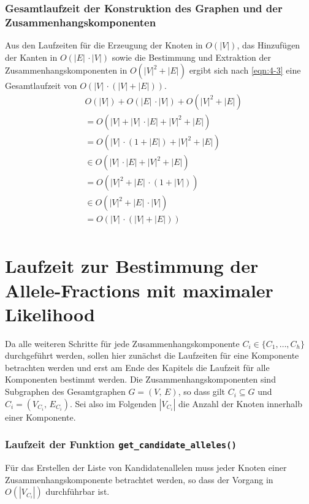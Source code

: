 \subsubsection{Gesamtlaufzeit der Konstruktion des Graphen und der Zusammenhangskomponenten} \label{subsec:graph_compl}
Aus den Laufzeiten für die Erzeugung der Knoten in $ O(|V|) $, das Hinzufügen der Kanten in $ O(|E|\, \cdotp |V|) $  sowie die Bestimmung und Extraktion der Zusammenhangskomponenten in $ O(|V|^2 + |E|) $ ergibt sich nach \eqref{eqn:4-3} eine Gesamtlaufzeit von $ O(|V| \, \cdotp (|V| + |E|)) $. \\
\begin{equation} \label{eqn:4-3}
\tag{4-3}
\begin{aligned}
&\ {} O(|V|) + O(|E|\, \cdotp |V|) + O(|V|^2 + |E|) \\
&\ = O(|V| + |V|\, \cdotp |E| + |V|^2 + |E|)\\
&\ = O(|V|\, \cdotp (1 + |E|) + |V|^2 + |E|)\\
&\ \in O(|V|\, \cdotp |E| + |V|^2 + |E|)\\
&\ = O(|V|^2 + |E| \, \cdotp (1 + |V|))\\
&\ \in O(|V|^2 + |E| \, \cdotp |V|)\\
&\ = O(|V| \, \cdotp (|V| + |E|))\\
\end{aligned}
\end{equation}

\section[Laufzeitberechnung der VAFs mit maximaler Likelihood]{Laufzeit zur Bestimmung der Allele-Fractions mit maximaler Likelihood}

Da alle weiteren Schritte für jede Zusammenhangskomponente $C_{i} \in \{C_{1}, \dots , C_{h}\}$ durchgeführt werden, sollen hier zunächst die Laufzeiten für eine Komponente betrachten werden und erst am Ende des Kapitels die Laufzeit für alle Komponenten bestimmt werden. Die Zusammenhangskomponenten sind Subgraphen des Gesamtgraphen $G=(V, \, E)$, so dass gilt $ C_{i} \subseteq G$ und $C_{i}=(V_{C_{i}}, \, E_{C_{i}})$. Sei also im Folgenden $|V_{C_{i}}|$ die Anzahl der Knoten innerhalb einer Komponente. \\ 

\subsubsection{Laufzeit der Funktion \lstinline|get_candidate_alleles()|}
Für das Erstellen der Liste von Kandidatenallelen muss jeder Knoten einer Zusammenhangskomponente betrachtet werden, so dass der Vorgang in $ O(|V_{C_{i}}|) $ durchführbar ist.\\

